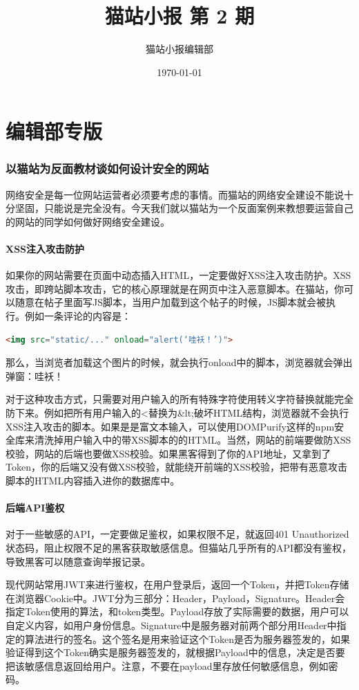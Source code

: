 \documentclass[UTF8,fontset=fandol]{ctexart}
\title{猫站小报 第 2 期}
\author{猫站小报编辑部}
\date{\today}
\begin{document}
\maketitle
\part{编辑部专版}
\section{以猫站为反面教材谈如何设计安全的网站}
网络安全是每一位网站运营者必须要考虑的事情。而猫站的网络安全建设不能说十分坚固，只能说是完全没有。今天我们就以猫站为一个反面案例来教想要运营自己的网站的同学如何做好网络安全建设。
\subsection{XSS注入攻击防护}
如果你的网站需要在页面中动态插入HTML，一定要做好XSS注入攻击防护。XSS攻击，即跨站脚本攻击，它的核心原理就是在网页中注入恶意脚本。在猫站，你可以随意在帖子里面写JS脚本，当用户加载到这个帖子的时候，JS脚本就会被执行。例如一条评论的内容是：
\begin{lstlisting}[language=HTML]
<img src="static/..." onload="alert(‘哇袄！’)">
\end{lstlisting}
那么，当浏览者加载这个图片的时候，就会执行onload中的脚本，浏览器就会弹出弹窗：哇袄！

对于这种攻击方式，只需要对用户输入的所有特殊字符使用转义字符替换就能完全防下来。例如把所有用户输入的<替换为\&lt;破坏HTML结构，浏览器就不会执行XSS注入攻击的脚本。如果是是富文本输入，可以使用DOMPurify这样的npm安全库来清洗掉用户输入中的带XSS脚本的的HTML。当然，网站的前端要做防XSS校验，网站的后端也要做XSS校验。如果黑客得到了你的API地址，又拿到了Token，你的后端又没有做XSS校验，就能绕开前端的XSS校验，把带有恶意攻击脚本的HTML内容插入进你的数据库中。

\subsection{后端API鉴权}
对于一些敏感的API，一定要做足鉴权，如果权限不足，就返回401 Unauthorized状态码，阻止权限不足的黑客获取敏感信息。但猫站几乎所有的API都没有鉴权，导致黑客可以随意查询举报记录。

现代网站常用JWT来进行鉴权，在用户登录后，返回一个Token，并把Token存储在浏览器Cookie中。JWT分为三部分：Header，Payload，Signature。Header会指定Token使用的算法，和token类型。Payload存放了实际需要的数据，用户可以自定义内容，如用户身份信息。Signature中是服务器对前两个部分用Header中指定的算法进行的签名。这个签名是用来验证这个Token是否为服务器签发的，如果验证得到这个Token确实是服务器签发的，就根据Payload中的信息，决定是否要把该敏感信息返回给用户。注意，不要在payload里存放任何敏感信息，例如密码。
\end{document}
